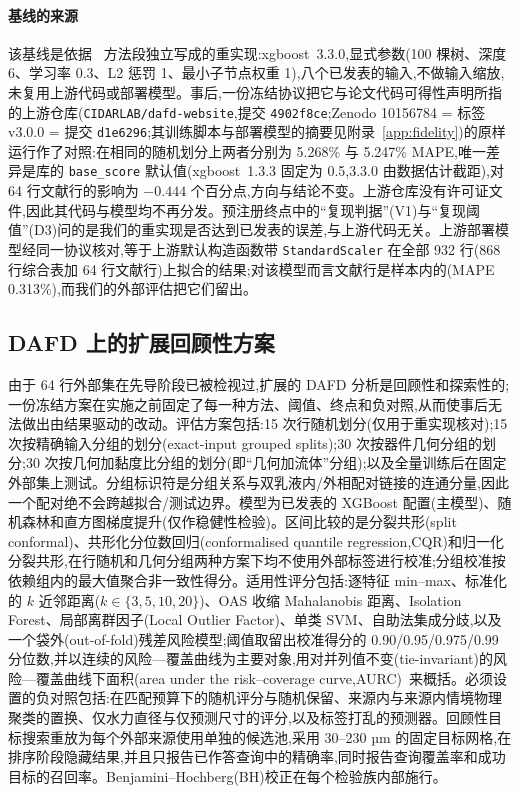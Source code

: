\documentclass[11pt,a4paper]{ctexart}
\begin{document}
\paragraph{基线的来源} 该基线是依据~\cite{lashkaripour2024} 方法段独立写成的重实现:xgboost~3.3.0,显式参数(100 棵树、深度 6、学习率 0.3、L2 惩罚 1、最小子节点权重 1),八个已发表的输入,不做输入缩放,未复用上游代码或部署模型。事后,一份冻结协议把它与论文代码可得性声明所指的上游仓库(\texttt{CIDARLAB/dafd-website},提交 \texttt{4902f8ce};Zenodo 10156784 = 标签 v3.0.0 = 提交 \texttt{d1e6296};其训练脚本与部署模型的摘要见附录~\ref{app:fidelity})的原样运行作了对照:在相同的随机划分上两者分别为 5.268\% 与 5.247\% MAPE,唯一差异是库的 \texttt{base\_score} 默认值(xgboost~1.3.3 固定为 0.5,3.3.0 由数据估计截距),对 64 行文献行的影响为 $-0.444$ 个百分点,方向与结论不变。上游仓库没有许可证文件,因此其代码与模型均不再分发。预注册终点中的“复现判据”(V1)与“复现阈值”(D3)问的是我们的重实现是否达到已发表的误差,与上游代码无关。上游部署模型经同一协议核对,等于上游默认构造函数带 \texttt{StandardScaler} 在全部 932 行(868 行综合表加 64 行文献行)上拟合的结果;对该模型而言文献行是样本内的(MAPE 0.313\%),而我们的外部评估把它们留出。

\subsection{DAFD 上的扩展回顾性方案}
\label{sec:expanded}

由于 64 行外部集在先导阶段已被检视过,扩展的 DAFD 分析是回顾性和探索性的;一份冻结方案在实施之前固定了每一种方法、阈值、终点和负对照,从而使事后无法做出由结果驱动的改动。评估方案包括:15 次行随机划分(仅用于重实现核对);15 次按精确输入分组的划分(exact-input grouped splits);30 次按器件几何分组的划分;30 次按几何加黏度比分组的划分(即“几何加流体”分组);以及全量训练后在固定外部集上测试。分组标识符是分组关系与双乳液内/外相配对链接的连通分量,因此一个配对绝不会跨越拟合/测试边界。模型为已发表的 XGBoost 配置(主模型)、随机森林和直方图梯度提升(仅作稳健性检验)。区间比较的是分裂共形(split conformal)、共形化分位数回归(conformalised quantile regression,CQR)和归一化分裂共形,在行随机和几何分组两种方案下均不使用外部标签进行校准;分组校准按依赖组内的最大值聚合非一致性得分。适用性评分包括:逐特征 min–max、标准化的 $k$ 近邻距离($k\in\{3,5,10,20\}$)、OAS 收缩 Mahalanobis 距离、Isolation Forest、局部离群因子(Local Outlier Factor)、单类 SVM、自助法集成分歧,以及一个袋外(out-of-fold)残差风险模型;阈值取留出校准得分的 0.90/0.95/0.975/0.99 分位数,并以连续的风险—覆盖曲线为主要对象,用对并列值不变(tie-invariant)的风险—覆盖曲线下面积(area under the risk–coverage curve,AURC)~\cite{elyaniv2010}来概括。必须设置的负对照包括:在匹配预算下的随机评分与随机保留、来源内与来源内情境物理聚类的置换、仅水力直径与仅预测尺寸的评分,以及标签打乱的预测器。回顾性目标搜索重放为每个外部来源使用单独的候选池,采用 30–230 µm 的固定目标网格,在排序阶段隐藏结果,并且只报告已作答查询中的精确率,同时报告查询覆盖率和成功目标的召回率。Benjamini–Hochberg(BH)校正在每个检验族内部施行。
\end{document}
